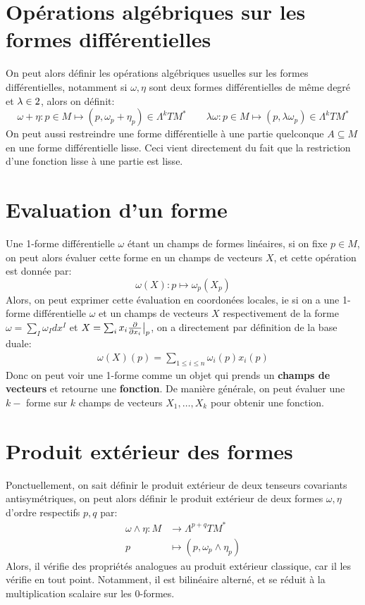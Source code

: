    \section{Opérations algébriques sur les formes différentielles}
      On peut alors définir les opérations algébriques usuelles sur les formes différentielles, notamment si \( \omega, \eta \) sont deux formes différentielles de même degré et \( \lambda \in 2 \), alors on définit:
      \[ 
         \omega + \eta : p \in M \longmapsto (p, \omega_p + \eta_p) \in \Lambda^kTM^* \quad\quad \lambda \omega: p \in M \longmapsto (p, \lambda \omega_p) \in \Lambda^kTM^*
      \] 
      On peut aussi restreindre une forme différentielle à une partie quelconque \( A \subseteq M \) en une forme différentielle lisse. Ceci vient directement du fait que la restriction d'une fonction lisse à une partie est lisse.
   \section{Evaluation d'un forme}
      Une 1-forme différentielle \( \omega \) étant un champs de formes linéaires, si on fixe \( p \in M \), on peut alors évaluer cette forme en un champs de vecteurs \( X \), et cette opération est donnée par:
      \[ 
         \omega(X) : p \longmapsto \omega_p(X_p)
      \]
      Alors, on peut exprimer cette évaluation en coordonées locales, ie si on a une 1-forme différentielle \( \omega \) et un champs de vecteurs \( X \) respectivement de la forme \( \omega = \sum_I \omega_I dx^I \) et \( X = \sum_i x_i \frac{\partial }{\partial x_i}\big|_p\), on a directement par définition de la base duale:
      \begin{align*}
         \omega(X)(p) = \sum_{1 \leq i \leq n} \omega_{i}(p)x_i(p)
      \end{align*} 
      Donc on peut voir une 1-forme comme un objet qui prends un \textbf{champs de vecteurs} et retourne une \textbf{fonction}. De manière générale, on peut évaluer une \( k-\) forme sur \( k \) champs de vecteurs \( X_1, \ldots, X_k \) pour obtenir une fonction.
   \section{Produit extérieur des formes}
      Ponctuellement, on sait définir le produit extérieur de deux tenseurs covariants antisymétriques, on peut alors définir le produit extérieur de deux formes \( \omega, \eta \) d'ordre respectifs \( p, q \) par:
      \[ 
         \begin{aligned}
            \omega \wedge \eta : M &\longrightarrow \Lambda^{p+q}TM^* \\
            p &\longmapsto (p, \omega_p \wedge \eta_p)
         \end{aligned}
      \]
      Alors, il vérifie des propriétés analogues au produit extérieur classique, car il les vérifie en tout point. Notamment, il est bilinéaire alterné, et se réduit à la multiplication scalaire sur les 0-formes.
